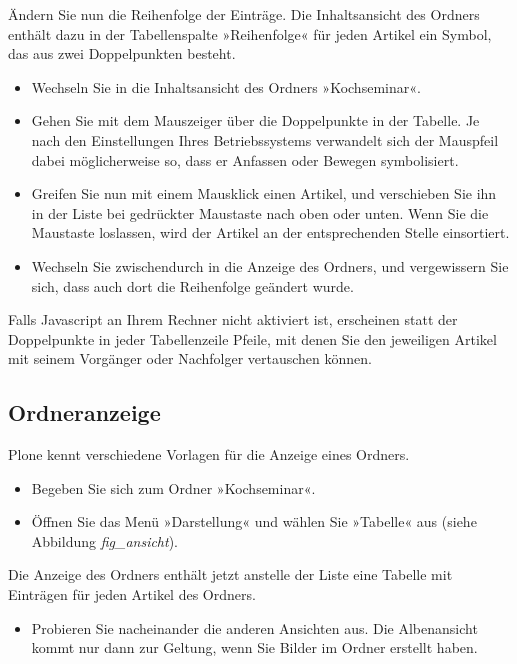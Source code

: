 \documentclass[a4paper,12pt,ngerman]{manual}
\begin{document}
Ändern Sie nun die Reihenfolge der Einträge. Die Inhaltsansicht des Ordners
enthält dazu in der Tabellenspalte »Reihenfolge« für jeden Artikel ein Symbol,
das aus zwei Doppelpunkten besteht.
\begin{itemize}
\item {} 
Wechseln Sie in die Inhaltsansicht des Ordners »Kochseminar«.

\item {} 
Gehen Sie mit dem Mauszeiger über die Doppelpunkte in der Tabelle. Je
nach den Einstellungen Ihres Betriebssystems verwandelt sich der Mauspfeil
dabei möglicherweise so, dass er Anfassen oder Bewegen symbolisiert.

\item {} 
Greifen Sie nun mit einem Mausklick einen Artikel, und verschieben Sie
ihn in der Liste bei gedrückter Maustaste nach oben oder unten. Wenn Sie die
Maustaste loslassen, wird der Artikel an der entsprechenden Stelle
einsortiert.

\item {} 
Wechseln Sie zwischendurch in die Anzeige des Ordners, und vergewissern
Sie sich, dass auch dort die Reihenfolge geändert wurde.

\end{itemize}

Falls Javascript an Ihrem Rechner nicht aktiviert ist, erscheinen statt der
Doppelpunkte in jeder Tabellenzeile Pfeile, mit denen Sie den jeweiligen
Artikel mit seinem Vorgänger oder Nachfolger vertauschen können.


\subsection{Ordneranzeige}

Plone kennt verschiedene Vorlagen für die Anzeige eines Ordners.
\begin{itemize}
\item {} 
Begeben Sie sich zum Ordner »Kochseminar«.

\item {} 
Öffnen Sie das Menü »Darstellung« und wählen Sie »Tabelle« aus (siehe
Abbildung \emph{fig\_ansicht}).

\end{itemize}
\hypertarget{fig-ansicht}{}
Die Anzeige des Ordners enthält jetzt anstelle der Liste eine Tabelle
mit Einträgen für jeden Artikel des Ordners.
\begin{itemize}
\item {} 
Probieren Sie nacheinander die anderen Ansichten aus. Die Albenansicht
kommt nur dann zur Geltung, wenn Sie Bilder im Ordner erstellt haben.

\end{itemize}
\end{document}
